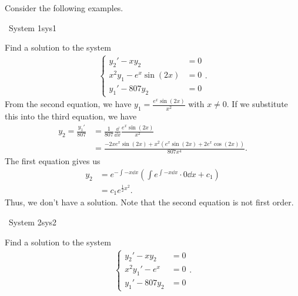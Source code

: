     \vphantom
    \\
    \\
    Consider the following examples.
    \begin{example}{\Difficulty\,\Difficulty\,\,System 1}{sys1}
        
        Find a solution to the system
        \begin{align*}
            \begin{cases}
                y_2'-xy_2&=0 \\
                x^2y_1-e^x\sin(2x)&=0 \\
                y_1'-807y_2&=0
            \end{cases}.
        \end{align*}
        From the second equation, we have \(y_1=\frac{e^x\sin(2x)}{x^2}\) with \(x\neq 0\). If we substitute this into the third equation, we have
        \begin{align*}
            y_2=\frac{y_1'}{807}&=\frac{1}{807}\frac{\dd}{\dd x}\frac{e^x\sin(2x)}{x^2} \\
            &=\frac{-2xe^x\sin(2x)+x^2(e^x\sin(2x)+2e^x\cos(2x))}{807x^4}.
        \end{align*}
        The first equation gives us
        \begin{align*}
            y_2&=e^{-\int -x\dd x}\left(\int e^{\int -x\dd x}\cdot 0\dd x+c_1\right) \\
            &=c_1e^{\frac{1}{2}x^2}.
        \end{align*}
        Thus, we don't have a solution. Note that the second equation is not first order.

    \end{example}
    \begin{example}{\Difficulty\,\Difficulty\,\,System 2}{sys2}
        
        Find a solution to the system
        \begin{align*}
            \begin{cases}
                y_2'-xy_2&=0 \\
                x^2y_1'-e^x&=0 \\
                y_1'-807y_2&=0
            \end{cases}.
        \end{align*}
       \DOTHISLATER

    \end{example}
    \vphantom
    \\
    \\
